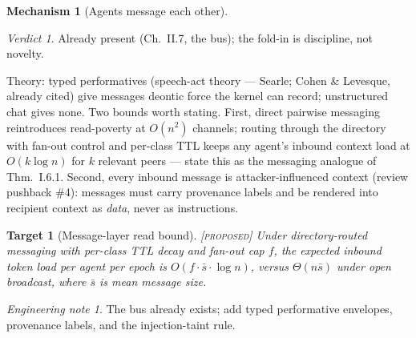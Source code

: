 \documentclass[11pt,a4paper]{article}
\newtheorem{target}{Target}[section]
\theoremstyle{definition}
\newtheorem{mech}{Mechanism}
\theoremstyle{remark}
\newtheorem*{verdict}{Verdict}
\newtheorem*{note}{Engineering note}
\newcommand{\grade}[1]{\textsc{[#1]}}
\begin{document}
\begin{mech}[Agents message each other]
\begin{verdict} Already present (Ch.~II.7, the bus); the fold-in is discipline, not novelty. \end{verdict}
Theory: typed performatives (speech-act theory --- Searle; Cohen \& Levesque, already cited) give messages deontic force the kernel can record; unstructured chat gives none. Two bounds worth stating. First, direct pairwise messaging reintroduces read-poverty at $O(n^2)$ channels; routing through the directory with fan-out control and per-class TTL keeps any agent's inbound context load at $O(k \log n)$ for $k$ relevant peers --- state this as the messaging analogue of Thm.~I.6.1. Second, every inbound message is attacker-influenced context (review pushback \#4): messages must carry provenance labels and be rendered into recipient context as \emph{data}, never as instructions.
\begin{target}[Message-layer read bound]\grade{proposed} Under directory-routed messaging with per-class TTL decay and fan-out cap $f$, the expected inbound token load per agent per epoch is $O(f \cdot \bar{s} \cdot \log n)$, versus $\Theta(n\bar{s})$ under open broadcast, where $\bar{s}$ is mean message size. \end{target}
\begin{note} The bus already exists; add typed performative envelopes, provenance labels, and the injection-taint rule. \end{note}
\end{mech}
\end{document}
